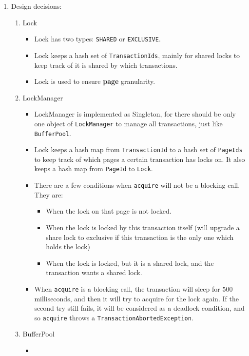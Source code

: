 \documentclass[10pt]{myland}
\begin{document}
\begin{enumerate}[label=\textbf{\arabic*.}, listparindent=0.0em, itemsep=2em]
    \item Design decisions:
        \begin{enumerate}
            \item Lock
                \begin{itemize}
                    \item Lock has two types: \texttt{SHARED} or \texttt{EXCLUSIVE}.
                    \item Lock keeps a hash set of \texttt{TransactionIds}, mainly for shared locks to keep track of
                        it is shared by which transactions.
                    \item Lock is used to ensure \textbf{page} granularity.
                \end{itemize}
            \item LockManager
                \begin{itemize}
                    \item LockManager is implemented as Singleton, for there should be only one object of
                        \texttt{LockManager} to manage all transactions, just like \texttt{BufferPool}.
                    \item Lock keeps a hash map from \texttt{TransactionId} to a hash set of \texttt{PageIds} to keep
                        track of which pages a certain transaction has locks on. It also keeps a hash map from \texttt{PageId}
                        to \texttt{Lock}.
                    \item There are a few conditions when \texttt{acquire} will not be a blocking call. They are:
                        \begin{itemize}
                            \item When the lock on that page is not locked.
                            \item When the lock is locked by this transaction itself (will upgrade a share lock to
                                exclusive if this transaction is the only one which holds the lock)
                            \item When the lock is locked, but it is a shared lock, and the transaction wants a shared lock.
                        \end{itemize}
                    \item When \texttt{acquire} is a blocking call, the transaction will sleep for 500 milliseconds, and
                        then it will try to acquire for the lock again. If the second try still fails, it will be
                        considered as a deadlock condition, and so \texttt{acquire} throws a \texttt{TransactionAbortedException}.
                \end{itemize}
            \item BufferPool
                \begin{itemize}
                    \item
                \end{itemize}
        \end{enumerate}


\end{enumerate}
\end{document}

